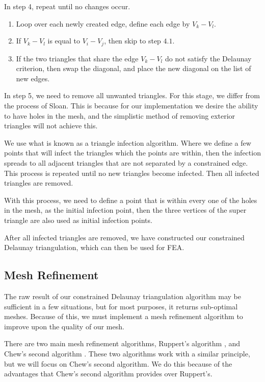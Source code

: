\documentclass[../fem.tex]{subfile}
\begin{document}
In step 4, repeat until no changes occur.
\begin{enumerate}[label=4.\arabic*.]
  \item Loop over each newly created edge, define each edge by $V_k-V_l$.
  \item If $V_k-V_l$ is equal to $V_i-V_j$, then skip to step $4.1$.
  \item If the two triangles that share the edge $V_k-V_l$ do not satisfy the
    Delaunay criterion, then swap the diagonal, and place the new diagonal on
    the list of new edges.
\end{enumerate}

In step 5, we need to remove all unwanted triangles. For this stage, we differ
from the process of Sloan. This is because for our implementation we desire the
ability to have holes in the mesh, and the simplistic method of removing
exterior triangles will not achieve this.

We use what is known as a triangle infection algorithm. Where we define a few
points that will infect the triangles which the points are within, then the
infection spreads to all adjacent triangles that are not separated by a
constrained edge. This process is repeated until no new triangles become
infected. Then all infected triangles are removed.

With this process, we need to define a point that is within every one of the
holes in the mesh, as the initial infection point, then the three vertices of
the super triangle are also used as initial infection points.

After all infected triangles are removed, we have constructed our constrained
Delaunay triangulation, which can then be used for FEA.

\subsection{Mesh Refinement}%
\label{sub:mesh_refinement2}

The raw result of our constrained Delaunay triangulation algorithm may be
sufficient in a few situations, but for most purposes, it returns sub-optimal
meshes. Because of this, we must implement a mesh refinement algorithm to
improve upon the quality of our mesh.

There are two main mesh refinement algorithms, Ruppert's algorithm
\cite{R_REF}, and Chew's second algorithm \cite{C_REF}. These two algorithms
work with a similar principle, but we will focus on Chew's second algorithm. We
do this because of the advantages that Chew's second algorithm provides over
Ruppert's.
\end{document}
